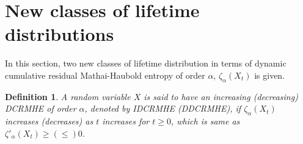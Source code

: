 \documentclass[11pt,reqno]{amsart}
\theoremstyle{tight}
\newtheorem{definition}{Definition}[section]
\begin{document}









\section{New classes of lifetime distributions}
 In this section, two new classes of lifetime distribution in terms of dynamic cumulative residual Mathai-Haubold entropy of order $\alpha$, $\zeta_{\alpha}(X_t)$ is given.\par

\begin{definition}
A random variable $X$ is said to have an increasing (decreasing) DCRMHE of order $\alpha$,  denoted by  IDCRMHE (DDCRMHE), if $\zeta_{\alpha}(X_t)$ increases (decreases) as $t$ increases for $t\geq 0$, which is same as $\zeta'_\alpha(X_t)\geq (\leq)0$.
\end{definition}
\end{document}
